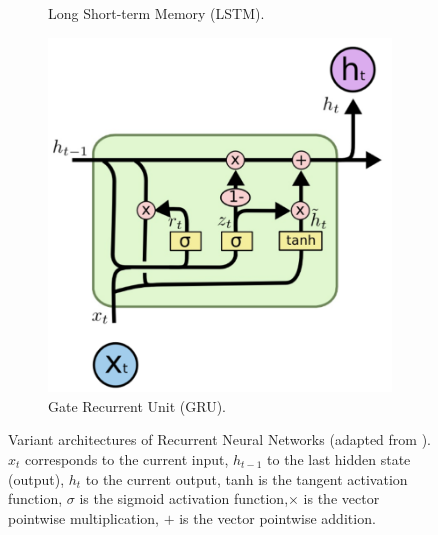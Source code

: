 \begin{figure}[h]
\begin{subfigure}[t]{0.3\textwidth}
      \caption{Long Short-term Memory (LSTM).} \label{fig:lstm}
    \end{subfigure}%
    \hspace{1em}
    \begin{subfigure}[t]{0.3\textwidth}
      \includegraphics[width=\linewidth]{imgs/models/gru-2.png}
      \caption{Gate Recurrent Unit (GRU).} \label{fig:gru}
    \end{subfigure}%
  \caption{Variant architectures of Recurrent Neural Networks (adapted from \citet{olahUnderstandingLSTMNetworks2015}).  $x_t$ corresponds to the current input, $h_{t-1}$ to the last hidden state (output), $h_t$ to the current output, tanh is the tangent activation function, $\sigma$ is the sigmoid activation function,$\times$ is the vector pointwise multiplication, $+$ is the vector pointwise addition.} \label{fig:recurrent-nn}
\end{figure}

